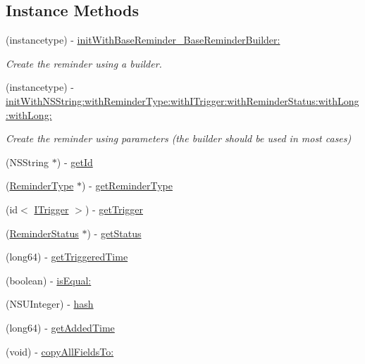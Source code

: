 \subsection*{Instance Methods}
\begin{DoxyCompactItemize}
\item 
(instancetype) -\/ \hyperlink{interface_base_reminder_a9d17459a70f74036103d8f65b6e40020}{init\+With\+Base\+Reminder\+\_\+\+Base\+Reminder\+Builder\+:}
\begin{DoxyCompactList}\small\item\em Create the reminder using a builder. \end{DoxyCompactList}\item 
(instancetype) -\/ \hyperlink{interface_base_reminder_aac17cfd7a9b2047fb3becb98b8a78106}{init\+With\+N\+S\+String\+:with\+Reminder\+Type\+:with\+I\+Trigger\+:with\+Reminder\+Status\+:with\+Long\+:with\+Long\+:}
\begin{DoxyCompactList}\small\item\em Create the reminder using parameters (the builder should be used in most cases) \end{DoxyCompactList}\item 
(N\+S\+String $\ast$) -\/ \hyperlink{interface_base_reminder_a495e771d52cd121bd8e95d9395ceb739}{get\+Id}
\item 
(\hyperlink{interface_reminder_type}{Reminder\+Type} $\ast$) -\/ \hyperlink{interface_base_reminder_aedfc2216109157851d20c7346db9b395}{get\+Reminder\+Type}
\item 
(id$<$ \hyperlink{protocol_i_trigger-p}{I\+Trigger} $>$) -\/ \hyperlink{interface_base_reminder_abef4c5814802d4b4c3c7b0e7ce69836f}{get\+Trigger}
\item 
(\hyperlink{interface_reminder_status}{Reminder\+Status} $\ast$) -\/ \hyperlink{interface_base_reminder_a5843e828f5a7cc87e98a974050632820}{get\+Status}
\item 
(long64) -\/ \hyperlink{interface_base_reminder_a82ce33dce05cbc5ea950c3de86b30822}{get\+Triggered\+Time}
\item 
(boolean) -\/ \hyperlink{interface_base_reminder_a70c1501567218c45cc3574a15af85773}{is\+Equal\+:}
\item 
(N\+S\+U\+Integer) -\/ \hyperlink{interface_base_reminder_ad717943f532e8a7194395e549eadbfa1}{hash}
\item 
(long64) -\/ \hyperlink{interface_base_reminder_a106bf204bd9a385a8a69ac7e6cc5b867}{get\+Added\+Time}
\item 
(void) -\/ \hyperlink{interface_base_reminder_a80a4c8578ddeba6a9b5334fee3eb0742}{copy\+All\+Fields\+To\+:}
\end{DoxyCompactItemize}
